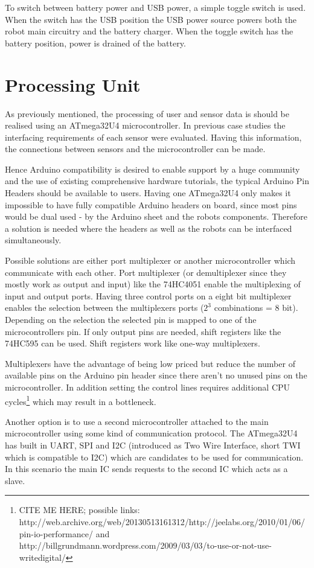 To switch between battery power and USB power, a simple toggle switch is used. When the switch has the USB position the USB power source powers both the robot main circuitry and the battery charger. When the toggle switch has the battery position, power is drained of the battery.

\section{Processing Unit}
As previously mentioned, the processing of user and sensor data is should be realised using an ATmega32U4 microcontroller. In previous case studies the interfacing requirements of each sensor were evaluated. Having this information, the connections between sensors and the microcontroller can be made.

Hence Arduino compatibility is desired to enable support by a huge community and the use of existing comprehensive hardware tutorials, the typical Arduino Pin Headers should be available to users. Having one ATmega32U4 only makes it impossible to have fully compatible Arduino headers on board, since most pins would be dual used  - by the Arduino sheet and the robots components. Therefore a solution is needed where the headers as well as the robots can be interfaced simultaneously.

Possible solutions are either port multiplexer or another microcontroller which communicate with each other. Port multiplexer (or demultiplexer since they mostly work as output and input) like the 74HC4051 enable the multiplexing of input and output ports. Having three control ports on a eight bit multiplexer enables the selection between the multiplexers ports ($2^3$ combinations = 8 bit). Depending on the selection the selected pin is mapped to one of the microcontrollers pin. If only output pins are needed, shift registers like the 74HC595 can be used. Shift registers work like one-way multiplexers.

Multiplexers have the advantage of being low priced but reduce the number of available pins on the Arduino pin header since there aren't no unused pins on the microcontroller. In addition setting the control lines requires additional CPU cycles\footnote{CITE ME HERE; possible links: http://web.archive.org/web/20130513161312/http://jeelabs.org/2010/01/06/pin-io-performance/ and http://billgrundmann.wordpress.com/2009/03/03/to-use-or-not-use-writedigital/} which may result in a bottleneck. 

Another option is to use a second microcontroller attached to the main microcontroller using some kind of communication protocol. The ATmega32U4 has built in UART, SPI and I2C (introduced as Two Wire Interface, short TWI which is compatible to I2C) which are candidates to be used for communication. In this scenario the main IC sends requests to the second IC which acts as a slave.

